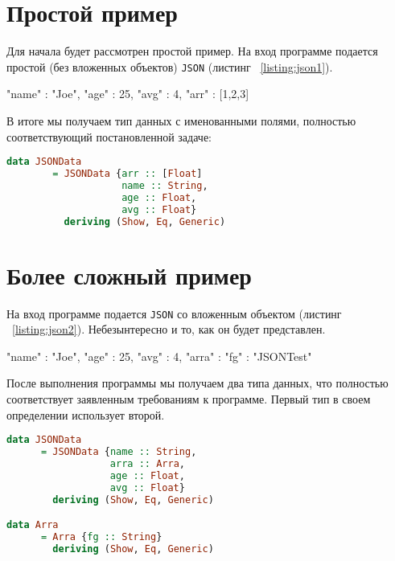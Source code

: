 \section{Простой пример}
Для начала будет рассмотрен простой пример. На вход программе подается простой (без вложенных объектов) \lstinline{JSON} (листинг ~\ref{listing:json1}).

\begin{ListingEnv}[H]
\begin{Verb}
{
    "name" : "Joe",
    "age" : 25,
    "avg" : 4,
    "arr" : [1,2,3]
}
\end{Verb}
\label{listing:json1}
\end{ListingEnv}

В итоге мы получаем тип данных с именованными полями, полностью соответствующий постановленной задаче:

\begin{lstlisting}[language=Haskell]
data JSONData 
        = JSONData {arr :: [Float]
                    name :: String,
                    age :: Float,
                    avg :: Float}
          deriving (Show, Eq, Generic)
\end{lstlisting}

\section{Более сложный пример}

На вход программе подается \lstinline{JSON} со вложенным объектом (листинг ~\ref{listing:json2}).  Небезынтересно и то, как он будет представлен. 

\begin{ListingEnv}[H]
\begin{Verb}
{
    "name" : "Joe",
    "age" : 25,
    "avg" : 4,
    "arra" : 
             {
                 "fg" : "JSONTest"  
             }
}
\end{Verb}
\label{listing:json2}
\end{ListingEnv}

После выполнения программы мы получаем два типа данных, что полностью соответствует заявленным требованиям к программе. Первый тип в своем определении использует второй. 

\begin{lstlisting}[language=Haskell]
data JSONData
      = JSONData {name :: String,
                  arra :: Arra,
                  age :: Float,
                  avg :: Float}
        deriving (Show, Eq, Generic)

data Arra
      = Arra {fg :: String}
        deriving (Show, Eq, Generic)            
\end{lstlisting}

